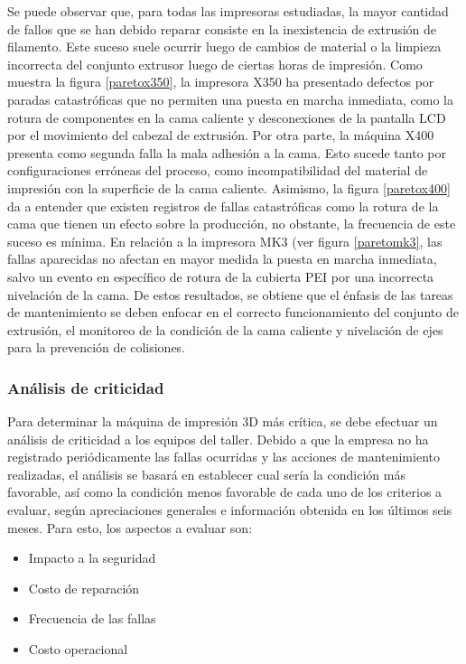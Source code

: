 Se puede observar que, para todas las impresoras estudiadas, la mayor cantidad de fallos que se han debido reparar consiste en la inexistencia de extrusión de filamento. Este suceso suele ocurrir luego de cambios de material o la limpieza incorrecta del conjunto extrusor luego de ciertas horas de impresión. Como muestra la figura \ref{paretox350}, la impresora X350 ha presentado defectos por paradas catastróficas que no permiten una puesta en marcha inmediata, como la rotura de componentes en la cama caliente y desconexiones de la pantalla LCD por el movimiento del cabezal de extrusión. Por otra parte, la máquina X400 presenta como segunda falla la mala adhesión a la cama. Esto sucede tanto por configuraciones erróneas del proceso, como incompatibilidad del material de impresión con la superficie de la cama caliente. Asimismo, la figura \ref{paretox400} da a entender que existen registros de fallas catastróficas como la rotura de la cama que tienen un efecto sobre la producción, no obstante, la frecuencia de este suceso es mínima. En relación a la impresora MK3 (ver figura \ref{paretomk3}, las fallas aparecidas no afectan en mayor medida la puesta en marcha inmediata, salvo un evento en específico de rotura de la cubierta PEI por una incorrecta nivelación de la cama. De estos resultados, se obtiene que el énfasis de las tareas de mantenimiento se deben enfocar en el correcto funcionamiento del conjunto de extrusión, el monitoreo de la condición de la cama caliente y nivelación de ejes para la prevención de colisiones. 



\subsubsection{Análisis de criticidad}

Para determinar la máquina de impresión 3D más crítica, se debe efectuar un análisis de criticidad a los equipos del taller. Debido a que la empresa no ha registrado periódicamente las fallas ocurridas y las acciones de mantenimiento realizadas, el análisis se basará en establecer cual sería la condición más favorable, así como la condición menos favorable de cada uno de los criterios a evaluar, según apreciaciones generales e información obtenida en los últimos seis meses. Para esto, los aspectos a evaluar son:

\begin{itemize}
\item Impacto a la seguridad
\item Costo de reparación
\item Frecuencia de las fallas
\item Costo operacional
\end{itemize}


